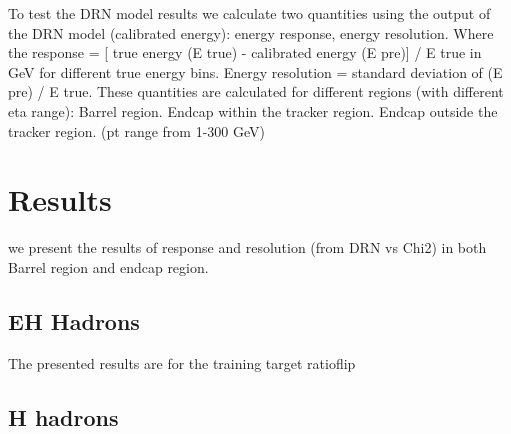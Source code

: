 To test the DRN model results we calculate two quantities using the output of the DRN model (calibrated energy): energy response, energy resolution.  
Where the response = [ true energy (E true) - calibrated energy (E pre)] / E true in GeV for different true energy bins. Energy resolution = standard deviation of (E pre) / E true.  
These quantities are calculated for different regions (with different eta range): Barrel region. Endcap within the tracker region. Endcap outside the tracker region. (pt range from 1-300 GeV)

\section{Results}
we present the results of response and resolution (from DRN vs Chi2) in  both Barrel region and endcap region.

\subsection{EH Hadrons}
The presented results are for the training target ratioflip






\subsection{H hadrons}





